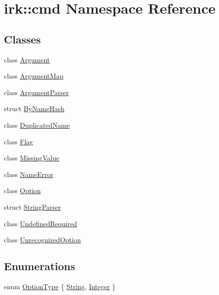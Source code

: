 \hypertarget{namespaceirk_1_1cmd}{}\section{irk\+:\+:cmd Namespace Reference}
\label{namespaceirk_1_1cmd}
\subsection*{Classes}
\begin{DoxyCompactItemize}
\item 
class \mbox{\hyperlink{classirk_1_1cmd_1_1Argument}{Argument}}
\item 
class \mbox{\hyperlink{classirk_1_1cmd_1_1ArgumentMap}{Argument\+Map}}
\item 
class \mbox{\hyperlink{classirk_1_1cmd_1_1ArgumentParser}{Argument\+Parser}}
\item 
struct \mbox{\hyperlink{structirk_1_1cmd_1_1ByNameHash}{By\+Name\+Hash}}
\item 
class \mbox{\hyperlink{classirk_1_1cmd_1_1DuplicatedName}{Duplicated\+Name}}
\item 
class \mbox{\hyperlink{classirk_1_1cmd_1_1Flag}{Flag}}
\item 
class \mbox{\hyperlink{classirk_1_1cmd_1_1MissingValue}{Missing\+Value}}
\item 
class \mbox{\hyperlink{classirk_1_1cmd_1_1NameError}{Name\+Error}}
\item 
class \mbox{\hyperlink{classirk_1_1cmd_1_1Option}{Option}}
\item 
struct \mbox{\hyperlink{structirk_1_1cmd_1_1StringParser}{String\+Parser}}
\item 
class \mbox{\hyperlink{classirk_1_1cmd_1_1UndefinedRequired}{Undefined\+Required}}
\item 
class \mbox{\hyperlink{classirk_1_1cmd_1_1UnrecognizedOption}{Unrecognized\+Option}}
\end{DoxyCompactItemize}
\subsection*{Enumerations}
\begin{DoxyCompactItemize}
\item 
enum \mbox{\hyperlink{namespaceirk_1_1cmd_a00c40b6f787aaf61fff82eec12904894}{Option\+Type}} \{ \mbox{\hyperlink{namespaceirk_1_1cmd_a00c40b6f787aaf61fff82eec12904894ae94bdb616ca71952612e4633232450e6}{String}}, 
\mbox{\hyperlink{namespaceirk_1_1cmd_a00c40b6f787aaf61fff82eec12904894a66d5a128cc55745e51ad11e033637e39}{Integer}}
 \}
\end{DoxyCompactItemize}


